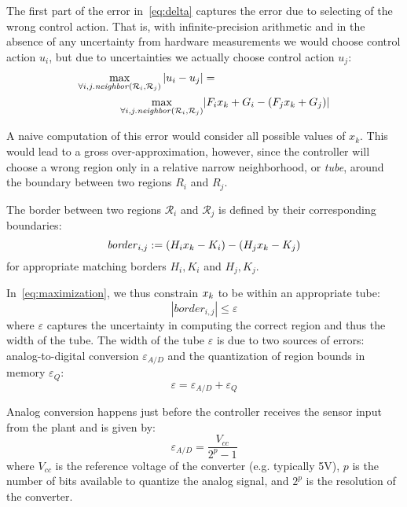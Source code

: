 The first part of the error in~\autoref{eq:delta} captures the error due to
selecting of the wrong control action. That is, with infinite-precision arithmetic
and in the absence of any uncertainty from hardware measurements we would choose
control action $u_i$, but due to uncertainties we actually choose control action $u_j$:
\begin{align} \label{eq:maximization}
  \max_{\forall i,j.\mathit{neighbor}(\mathcal{R}_{i},\mathcal{R}_{j})}|u_{i}-u_{j}|&= \\
  \max_{\forall i,j.\mathit{neighbor}(\mathcal{R}_{i},\mathcal{R}_{j})}&|F_{i}x_{k}+G_{i} - (F_{j}x_{k}+G_{j})|\nonumber
\end{align}


A naive computation of this error would consider all possible values of $x_k$.
This would lead to a gross over-approximation, however, since the controller
will choose a wrong region only in a relative narrow neighborhood, or
\emph{tube}, around the boundary between two regions $R_i$ and $R_j$.

The border between two regions $\mathcal{R}_{i}$ and $\mathcal{R}_{j}$ is defined by 
their corresponding boundaries:
\begin{equation}
\mathit{border}_{i,j} :=(H_i x_{k} - K_i ) - (H_j x_{k} - K_j)
\end{equation}
for appropriate matching borders $H_i, K_i$ and $H_j, K_j$.

In~\autoref{eq:maximization}, we thus constrain $x_{k}$ to be within an appropriate tube:
\begin{equation}\label{eq:tube}
|\mathit{border}_{i,j}| \le \varepsilon
\end{equation}
where $\varepsilon$ captures the uncertainty in computing the
correct region and thus the width of the tube.
%
The width of the tube $\varepsilon$ is due to two sources of errors:
analog-to-digital conversion $\varepsilon_{A/D}$ and the quantization of region
bounds in memory $\varepsilon_{Q}$:
\begin{equation}\label{eq:epsilontot}
  \varepsilon=\varepsilon_{A/D}+\varepsilon_{Q}
\end{equation}

Analog conversion happens just before the controller receives the sensor input from the plant
and is given by:
\begin{equation*}
\varepsilon_{A/D}=\frac{V_{cc}}{2^{p}-1}
\end{equation*}
where $V_{cc}$ is the reference voltage of the converter (e.g. typically 5V), $p$
is the number of bits available to quantize the analog signal, and $2^{p}$ is
the resolution of the converter.


